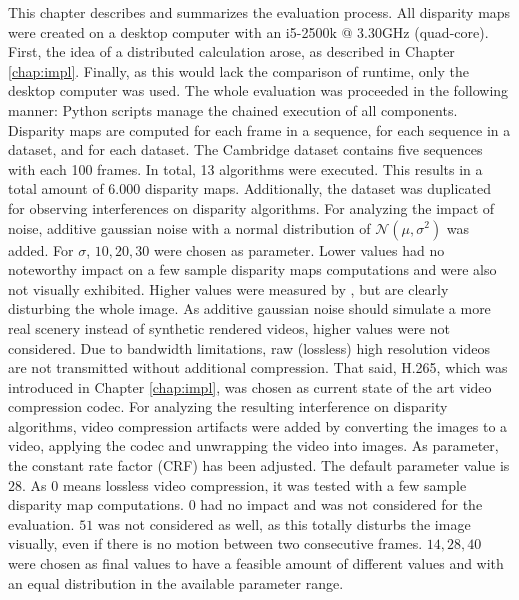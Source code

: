 This chapter describes and summarizes the evaluation process.
All disparity maps were created on a desktop computer with an i5-2500k @ 3.30GHz (quad-core).
First, the idea of a distributed calculation arose, as described in Chapter \ref{chap:impl}.
Finally, as this would lack the comparison of runtime, only the desktop computer was used.
\newline\newline\noindent The whole evaluation was proceeded in the following manner:
Python scripts manage the chained execution of all components.
Disparity maps are computed for each frame in a sequence, for each sequence in a dataset, and for each dataset.
The Cambridge dataset contains five sequences with each 100 frames.
In total, 13 algorithms were executed.
This results in a total amount of $6.000$ disparity maps.
\newline\newline\noindent Additionally, the dataset was duplicated for observing interferences on disparity algorithms.
For analyzing the impact of noise, additive gaussian noise with a normal distribution of $\mathcal{N}(\mu,\sigma^2)$ was added.
For $\sigma$, $10, 20, 30$ were chosen as parameter.
Lower values had no noteworthy impact on a few sample disparity maps computations and were also not visually exhibited.
Higher values were measured by \citeauthor{richardt2010real} \citep{richardt2010real}, but are clearly disturbing the whole image.
As additive gaussian noise should simulate a more real scenery instead of synthetic rendered videos, higher values were not considered.
\newline\newline\noindent Due to bandwidth limitations, raw (lossless) high resolution videos are not transmitted without additional compression.
That said, H.265, which was introduced in Chapter \ref{chap:impl}, was chosen as current state of the art video compression codec.
For analyzing the resulting interference on disparity algorithms, video compression artifacts were added by converting the images to a video, applying the codec and unwrapping the video into images.
As parameter, the constant rate factor (CRF) has been adjusted.
The default parameter value is $28$.
As $0$ means lossless video compression, it was tested with a few sample disparity map computations.
$0$ had no impact and was not considered for the evaluation.
$51$ was not considered as well, as this totally disturbs the image visually, even if there is no motion between two consecutive frames.
$14, 28, 40$ were chosen as final values to have a feasible amount of different values and with an equal distribution in the available parameter range.
